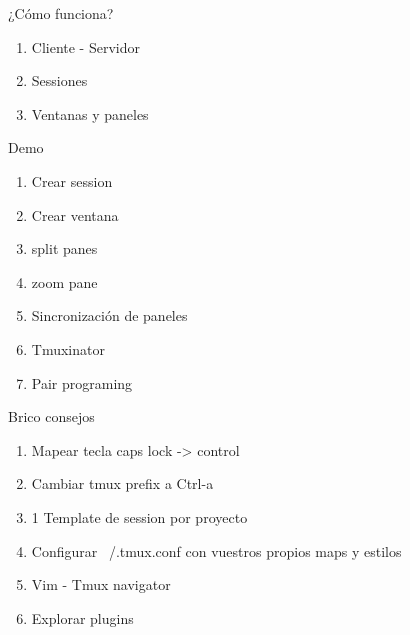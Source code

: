 \documentclass{beamer}
\begin{document}
\begin{frame}{¿Cómo funciona?}
  \begin{enumerate}
  \item Cliente - Servidor
  \item Sessiones
  \item Ventanas y paneles
  \end{enumerate}
\end{frame}

\begin{frame}{Demo}
  \begin{enumerate}
  \item Crear session
  \item Crear ventana
  \item split panes
  \item zoom pane
  \item Sincronización de paneles
  \item Tmuxinator
  \item Pair programing
  \end{enumerate}
\end{frame}

\begin{frame}{Brico consejos}
  \begin{enumerate}
  \item Mapear tecla caps lock -> control
  \item Cambiar tmux prefix a Ctrl-a
  \item 1 Template de session por proyecto
  \item Configurar ~/.tmux.conf con vuestros propios maps y estilos
  \item Vim - Tmux navigator
  \item Explorar plugins
  \end{enumerate}
\end{frame}
\end{document}

